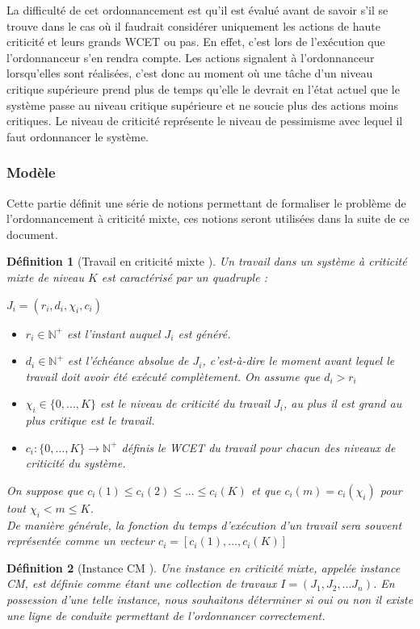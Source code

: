 \documentclass[a4paper]{report}
\theoremstyle{break}
\newtheorem{defin}{Définition}
\begin{document}
La difficulté de cet ordonnancement est qu'il est évalué avant de savoir s'il se trouve dans le cas où il faudrait considérer uniquement les actions de haute criticité et leurs grands WCET ou pas. En effet, c'est lors de l'exécution que l'ordonnanceur s'en rendra compte. Les actions signalent à l'ordonnanceur lorsqu'elles sont réalisées, c'est donc au moment où une tâche d'un niveau critique supérieure prend plus de temps qu'elle le devrait en l'état actuel que le système passe au niveau critique supérieure et ne soucie plus des actions moins critiques. Le niveau de criticité représente le niveau de pessimisme avec lequel il faut ordonnancer le système. 

\subsubsection{Modèle}
Cette partie définit une série de notions permettant de formaliser le problème de l'ordonnancement à criticité mixte, ces notions seront utilisées dans la suite de ce document.

\begin{defin}[Travail en criticité mixte \cite{BaruahBDMSS11}]
Un travail dans un système à criticité mixte de niveau $K$ est caractérisé par un quadruple : 
\begin{center}
 $J_i = (r_i, d_i, \chi_i, c_i)$ 
\end{center}
\begin{itemize}
\item $r_i \in \mathbb{N}^{+}$ est l'instant auquel $J_i$ est généré.
\item $d_i \in \mathbb{N}^{+}$ est l'échéance absolue de $J_i$, c'est-à-dire le moment avant lequel le travail doit avoir été exécuté complètement. On assume que $d_i > r_i$
\item $\chi_i \in \{0, ..., K\}$ est le niveau de criticité du travail $J_i$, au plus il est grand au plus critique est le travail.
\item $c_i : \{0, ..., K\} \rightarrow \mathbb{N}^{+}$ définis le WCET du travail pour chacun des niveaux de criticité du système.
\end{itemize}
On suppose que $c_i(1) \leq c_i(2) \leq ... \leq c_i(K)$ et que $c_i(m) = c_i(\chi_i)$ pour tout $\chi_i < m \leq K$.\\
De manière générale, la fonction du temps d'exécution d'un travail sera souvent représentée comme un vecteur $c_i = [c_i(1), ..., c_i(K)]$
\end{defin}
\begin{defin}[Instance CM \cite{baruah2010towards}]
Une instance en criticité mixte, appelée instance CM, est définie comme étant une collection de travaux $I = (J_1, J_2, ... J_n)$. En possession d'une telle instance, nous souhaitons déterminer si oui ou non il existe une ligne de conduite permettant de l'ordonnancer correctement.
\end{defin}
\end{document}
